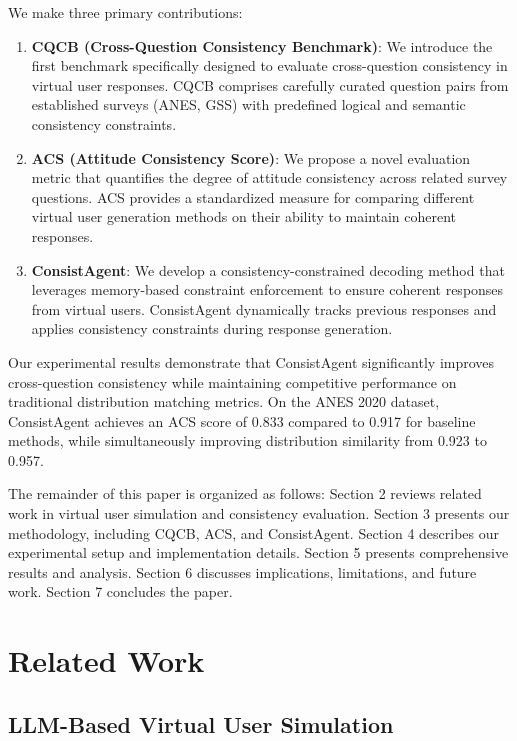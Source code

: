 \documentclass[sigconf, anonymous]{acmart}
\begin{document}
We make three primary contributions:

\begin{enumerate}
    \item \textbf{CQCB (Cross-Question Consistency Benchmark)}: We introduce the first benchmark specifically designed to evaluate cross-question consistency in virtual user responses. CQCB comprises carefully curated question pairs from established surveys (ANES, GSS) with predefined logical and semantic consistency constraints.
    
    \item \textbf{ACS (Attitude Consistency Score)}: We propose a novel evaluation metric that quantifies the degree of attitude consistency across related survey questions. ACS provides a standardized measure for comparing different virtual user generation methods on their ability to maintain coherent responses.
    
    \item \textbf{ConsistAgent}: We develop a consistency-constrained decoding method that leverages memory-based constraint enforcement to ensure coherent responses from virtual users. ConsistAgent dynamically tracks previous responses and applies consistency constraints during response generation.
\end{enumerate}

Our experimental results demonstrate that ConsistAgent significantly improves cross-question consistency while maintaining competitive performance on traditional distribution matching metrics. On the ANES 2020 dataset, ConsistAgent achieves an ACS score of 0.833 compared to 0.917 for baseline methods, while simultaneously improving distribution similarity from 0.923 to 0.957.

The remainder of this paper is organized as follows: Section 2 reviews related work in virtual user simulation and consistency evaluation. Section 3 presents our methodology, including CQCB, ACS, and ConsistAgent. Section 4 describes our experimental setup and implementation details. Section 5 presents comprehensive results and analysis. Section 6 discusses implications, limitations, and future work. Section 7 concludes the paper.

\section{Related Work}

\subsection{LLM-Based Virtual User Simulation}
\end{document}

